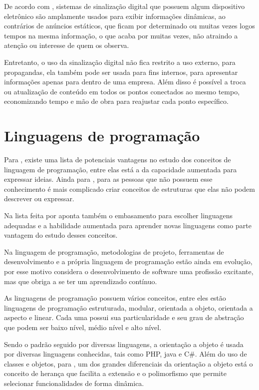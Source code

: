 De acordo com \cite{mishima2016}, sistemas de sinalização
digital que possuem algum dispositivo eletrônico são amplamente usados para exibir informações dinâmicas, ao contrários de anúncios estáticos, que ficam por determinado ou muitas vezes logos tempos na mesma informação, o que acaba por muitas vezes, não atraindo a atenção ou interesse de quem os observa.

Entretanto, o uso da sinalização digital não fica restrito a uso externo, para propagandas, ela também pode ser usada para fins internos, para apresentar informações apenas para dentro de uma empresa. Além disso é possível a troca ou atualização de conteúdo em todos os pontos conectados ao mesmo tempo, economizando tempo e mão de obra para reajustar cada ponto específico.

\section{Linguagens de programação}
Para \cite{sebesta2011}, existe uma lista de potenciais vantagens no estudo dos conceitos de linguagem de programação, entre elas está a da capacidade aumentada para expressar ideias. Ainda para \cite{sebesta2011}, para as pessoas que não possuem esse conhecimento é mais complicado criar conceitos de estruturas que elas não podem descrever ou expressar. 

Na lista feita por \cite{sebesta2011} aponta também o embasamento para escolher linguagens adequadas e a habilidade aumentada para aprender novas linguagens como parte vantagem do estudo desses conceitos.

Na linguagem de programação, metodologias de projeto, ferramentas de desenvolvimento e a própria linguagem de programação estão ainda em evolução, por esse motivo \cite{sebesta2011} considera o desenvolvimento de software uma profissão excitante, mas que obriga a se ter um aprendizado contínuo.

As linguagens de programação possuem vários conceitos, entre eles estão linguagens de programação estruturada, modular, orientada a objeto, orientada a aspecto e linear. Cada uma possui sua particularidade e seu grau de abstração que podem ser baixo nível, médio nível e alto nível.

Sendo o padrão seguido por diversas linguagens, a orientação a objeto é usada por diversas linguagens conhecidas, tais como PHP, java e C\#. Além do uso de classes e objetos, para \cite{ricarte2001}, um dos grandes diferenciais da orientação a objeto está o conceito de herança que facilita a extensão e o polimorfismo que permite selecionar funcionalidades de forma dinâmica.

